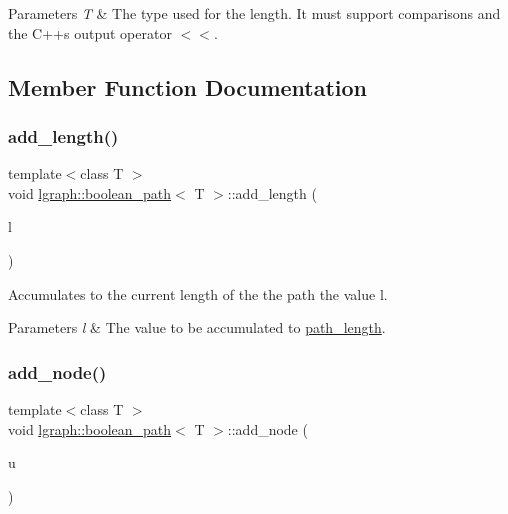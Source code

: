 \begin{DoxyParams}{Parameters}
{\em T} & The type used for the length. It must support comparisons and the C++\textquotesingle{}s output operator $<$$<$. \\
\hline
\end{DoxyParams}


\subsection{Member Function Documentation}
\mbox{\label{classlgraph_1_1boolean__path_affb5cf1d4157f95d956ca10aea3c3d2c}} 
\subsubsection{\texorpdfstring{add\+\_\+length()}{add\_length()}}
{\footnotesize\ttfamily template$<$class T $>$ \\
void \hyperlink{classlgraph_1_1boolean__path}{lgraph\+::boolean\+\_\+path}$<$ T $>$\+::add\+\_\+length (\begin{DoxyParamCaption}\item[{const T \&}]{l }\end{DoxyParamCaption})}



Accumulates to the current length of the the path the value l. 


\begin{DoxyParams}{Parameters}
{\em l} & The value to be accumulated to \hyperlink{classlgraph_1_1boolean__path_ab298ac156fd7d73e21769fd30b2c5ad1}{path\+\_\+length}. \\
\hline
\end{DoxyParams}
\mbox{\label{classlgraph_1_1boolean__path_a2d8a7182f9519e56bc13e1f64f8e7195}} 
\subsubsection{\texorpdfstring{add\+\_\+node()}{add\_node()}}
{\footnotesize\ttfamily template$<$class T $>$ \\
void \hyperlink{classlgraph_1_1boolean__path}{lgraph\+::boolean\+\_\+path}$<$ T $>$\+::add\+\_\+node (\begin{DoxyParamCaption}\item[{\hyperlink{namespacelgraph_a397169dd66adf725210a30fb7251773e}{node}}]{u }\end{DoxyParamCaption})}




